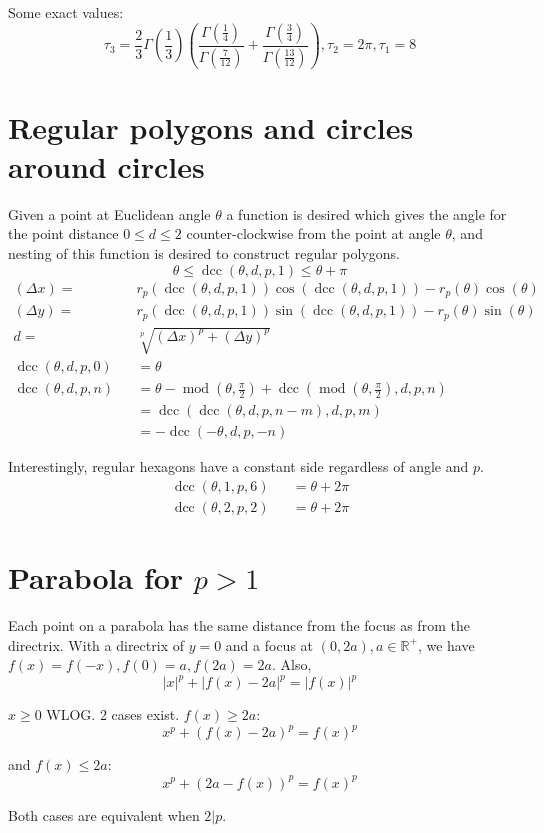 \documentclass[]{article}
\DeclareMathOperator{\md}{mod}
\DeclareMathOperator{\dcc}{dcc}
\newcommand{\paren}[1]{{\left(#1\right)}}
\newcommand{\abs}[1]{{\left\lvert#1\right\rvert}}
\begin{document}
Some exact values:
\begin{equation}
\tau_3=\frac{2}{3} \Gamma \paren{\frac{1}{3}} \paren{\frac{\Gamma \paren{\frac{1}{4}}}{\Gamma \paren{\frac{7}{12}}}+\frac{\Gamma \paren{\frac{3}{4}}}{\Gamma \paren{\frac{13}{12}}}}, \tau_2=2\pi,\tau_1=8
\end{equation}


\section{Regular polygons and circles around circles}
Given a point at Euclidean angle $\theta$ a function is desired which gives the angle for the point distance $0\leq d\leq 2$ counter-clockwise from the point at angle $\theta$, and nesting of this function is desired to construct regular polygons.
\begin{equation}
\theta\leq\dcc\paren{\theta,d,p,1}\leq\theta+\pi
\end{equation}
\begin{align}
\paren{\Delta x}= &&
r_p\paren{\dcc\paren{\theta,d,p,1}}\cos\paren{\dcc\paren{\theta,d,p,1}}-r_p\paren{\theta}\cos\paren{\theta}\\
\paren{\Delta y}= &&
r_p\paren{\dcc\paren{\theta,d,p,1}}\sin\paren{\dcc\paren{\theta,d,p,1}}-r_p\paren{\theta}\sin\paren{\theta}\\
d= &&
\sqrt[p]{\paren{\Delta x}^p+\paren{\Delta y}^p}\\
\dcc\paren{\theta,d,p,0}
&& =\theta
\\
\dcc\paren{\theta,d,p,n}
&& =\theta -\md\paren{\theta,\frac{\pi}{2}}+\dcc\paren{\md\paren{\theta,\frac{\pi}{2}},d,p,n}
\\
&& =\dcc\paren{\dcc\paren{\theta,d,p,n-m},d,p,m}
\\
&& =-\dcc\paren{-\theta,d,p,-n}
\end{align}

Interestingly, regular hexagons have a constant side regardless of angle and $p$.
\begin{align}
\dcc\paren{\theta,1,p,6}
&& =\theta + 2\pi
\\
\dcc\paren{\theta,2,p,2}
&& =\theta + 2\pi
\end{align}



\section{Parabola for $p>1$}
Each point on a parabola has the same distance from the focus as from the directrix. With a directrix of $y=0$ and a focus at $\paren{0,2a}, a\in\mathbb{R}^+$, we have $f\paren{x}=f\paren{-x},f\paren{0}=a,f\paren{2a}=2a$. Also,
\begin{equation}
\abs{x}^p+\abs{f\paren{x}-2a}^p=\abs{f\paren{x}}^p
\end{equation}

$x\geq 0$ WLOG. 2 cases exist. $f\paren{x}\geq 2a$:
\begin{equation}
x^p+\paren{f\paren{x}-2a}^p={f\paren{x}}^p
\end{equation}

and $f\paren{x}\leq 2a$:
\begin{equation}
x^p+\paren{2a-f\paren{x}}^p={f\paren{x}}^p
\end{equation}

Both cases are equivalent when $2 \vert p$.
\end{document}

